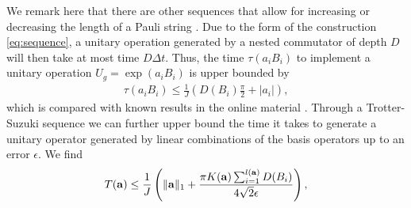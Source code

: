 \documentclass[aps,twocolumn,amsmath,amssymb,nofootinbib,superscriptaddress]{revtex4-1}
\begin{document}
  We remark here that there are other sequences that allow for increasing or decreasing the length of a Pauli string \cite{AnSequence}. Due to the form of the construction \eqref{eq:sequence}, a unitary operation generated by a nested commutator of depth $D$ will then take at most time $D\Delta t$. Thus, the time $\tau(a_{i}B_{i})$ to implement a unitary operation $U_{g}=\exp(a_{i}B_{i})$ is upper bounded by 
  \begin{align}
\label{eq:taB}
\tau(a_{i}B_{i})\leq \frac{1}{J}\left(D(B_{i})\frac{\pi}{2}+|a_{i}|\right),   
\end{align}
which is compared with known results in the online material \cite{OnlineMaterial}. 
Through a Trotter-Suzuki sequence \cite{Trotter} we can further upper bound the time it takes to generate a unitary operator generated by linear combinations of the basis operators up to an error $\epsilon$. We find 
  \begin{align}
  \label{eq:boundF}
  	T(\bold{a})\leq \frac{1}{J}\left(\Vert\bold{a}\Vert_{1}+\frac{\pi K(\bold{a})\sum_{i=1}^{l(\bold{a})}D(B_{i})}{4\sqrt{2}\epsilon}  \right),
  \end{align}
\end{document}
